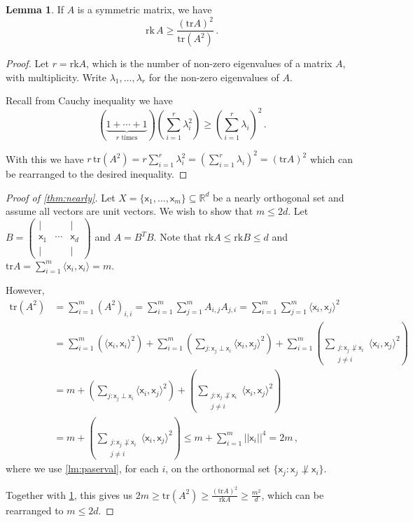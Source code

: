 \documentclass[12pt]{amsart}
\theoremstyle{definition}
\newtheorem{lm}[thm]{Lemma}
\newcommand{\R}{\mathbb{R}}
\newcommand{\vx}{\mathsf{x}}
\newcommand{\rk}{\mathrm{rk}}
\newcommand{\tr}{\mathrm{tr}}
\begin{document}
\begin{lm}\label{lm:rank_ineq}
If $A$ is a symmetric matrix, we have 
$$ \rk \, A \geq \frac{(\tr A)^2}{\tr (A^2)} \,  . $$
\end{lm}

\begin{proof}
Let $r = \rk A$, which is the number of non-zero eigenvalues of a matrix $A$, with multiplicity.
Write $\lambda_1, \ldots, \lambda_r$ for the non-zero eigenvalues of $A$.

Recall from Cauchy inequality we have
$$\left( \underbrace{1 + \cdots + 1}_{r \text{ times}} \right)\left(\sum_{i=1}^r \lambda_i^2 \right) \geq \left( \sum_{i=1}^r \lambda_i \right)^2\, . $$

With this we have $ r \, \tr (A^2) = r \sum_{i=1}^r \lambda_i^2 =  \left( \sum_{i=1}^r \lambda_i \right)^2 = (\tr A)^2 $ which can be rearranged to the desired inequality.
\end{proof}


\begin{proof}[Proof of \cref{thm:nearly}]
Let $X = \{\vx_1, \ldots, \vx_m\}\subseteq \R^d$ be a nearly orthogonal set and assume all vectors are unit vectors.
We wish to show that $m \leq 2 d$.
Let $B = \begin{pmatrix}
| &  & | \\ \vx_1 & \cdots & \vx_d \\ | & & | \end{pmatrix}$ and $A = B^T B$.
Note that $\rk A \leq \rk B\leq d$ and $\tr A = \sum_{i=1}^m \langle \vx_i, \vx_i\rangle = m$.

However,
\begin{align*}
\tr (A^2) &= \sum_{i=1}^m (A^2)_{i, i} = \sum_{i=1}^m \sum_{j=1}^m A_{i, j} A_{j, i} = \sum_{i=1}^m \sum_{j=1}^m \langle \vx_i, \vx_j \rangle^2 \\
&= \sum_{i=1}^m \left(\langle \vx_i, \vx_i \rangle^2 \right)+ \sum_{i=1}^m\left( \sum_{j : \vx_j \perp \vx_i } \langle \vx_i, \vx_j \rangle^2 \right) + \sum_{i=1}^m\left( \sum_{\substack{j : \vx_j \not\perp \vx_i \\ j \neq i}} \langle \vx_i, \vx_j \rangle^2 \right) \\
&= m + \left( \sum_{j : \vx_j \perp \vx_i } \langle \vx_i, \vx_j \rangle^2 \right) + \left( \sum_{\substack{j : \vx_j \not\perp \vx_i \\ j \neq i}} \langle \vx_i, \vx_j \rangle^2 \right)\\
&= m + \left( \sum_{\substack{j : \vx_j \not\perp \vx_i \\ j \neq i}} \langle \vx_i, \vx_j \rangle^2 \right) \leq m + \sum_{i=1}^m ||\vx_i ||^4  = 2m  \, , 
\end{align*}
where we use \cref{lm:paserval}, for each $i$, on the orthonormal set $\{\vx_j : \vx_j \not\perp \vx_i\}$.

Together with \cref{lm:rank_ineq}, this gives us $ 2m \geq \tr(A^2) \geq \frac{(\tr A )^2}{\rk A}\geq \frac{m^2}{d}$, which can be rearranged to $m \leq 2d $.
\end{proof}
\end{document}
